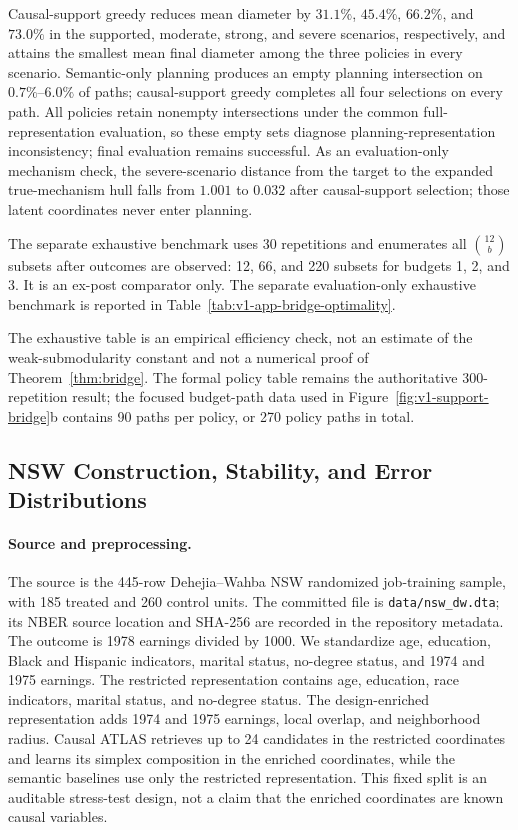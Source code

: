 \documentclass[11pt]{article}
\numberwithin{equation}{section}
\newcommand{\1}{\mathbf 1}
\begin{document}


Causal-support greedy reduces mean diameter by $31.1\%$, $45.4\%$, $66.2\%$, and $73.0\%$ in the supported, moderate, strong, and severe scenarios, respectively, and attains the smallest mean final diameter among the three policies in every scenario.  Semantic-only planning produces an empty planning intersection on $0.7\%$--$6.0\%$ of paths; causal-support greedy completes all four selections on every path.  All policies retain nonempty intersections under the common full-representation evaluation, so these empty sets diagnose planning-representation inconsistency; final evaluation remains successful.  As an evaluation-only mechanism check, the severe-scenario distance from the target to the expanded true-mechanism hull falls from $1.001$ to $0.032$ after causal-support selection; those latent coordinates never enter planning.

The separate exhaustive benchmark uses 30 repetitions and enumerates all $\binom{12}{b}$ subsets after outcomes are observed: 12, 66, and 220 subsets for budgets 1, 2, and 3.  It is an ex-post comparator only. The separate evaluation-only exhaustive benchmark is reported in Table~\ref{tab:v1-app-bridge-optimality}.



The exhaustive table is an empirical efficiency check, not an estimate of the weak-submodularity constant and not a numerical proof of Theorem~\ref{thm:bridge}.  The formal policy table remains the authoritative 300-repetition result; the focused budget-path data used in Figure~\ref{fig:v1-support-bridge}b contains 90 paths per policy, or 270 policy paths in total.


\subsection{NSW Construction, Stability, and Error Distributions}
\label{app:nsw-details}
\suppressfloats[t]

\paragraph{Source and preprocessing.}
The source is the 445-row Dehejia--Wahba NSW randomized job-training sample, with 185 treated and 260 control units.  The committed file is \texttt{data/nsw\_dw.dta}; its NBER source location and SHA-256 are recorded in the repository metadata.  The outcome is 1978 earnings divided by 1000.  We standardize age, education, Black and Hispanic indicators, marital status, no-degree status, and 1974 and 1975 earnings.  The restricted representation contains age, education, race indicators, marital status, and no-degree status.  The design-enriched representation adds 1974 and 1975 earnings, local overlap, and neighborhood radius.  Causal ATLAS retrieves up to 24 candidates in the restricted coordinates and learns its simplex composition in the enriched coordinates, while the semantic baselines use only the restricted representation.  This fixed split is an auditable stress-test design, not a claim that the enriched coordinates are known causal variables.
\end{document}
